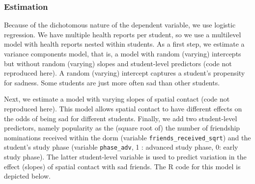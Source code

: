 \documentclass[doc]{apa6}
\begin{document}
\subsubsection{Estimation}\label{estimation}

Because of the dichotomous nature of the dependent variable, we use
logistic regression. We have multiple health reports per student, so we
use a multilevel model with health reports nested within students. As a
first step, we estimate a variance components model, that is, a model
with random (varying) intercepts but without random (varying) slopes and
student-level predictors (code not reproduced here). A random (varying)
intercept captures a student's propensity for sadness. Some students are
just more often sad than other students.

Next, we estimate a model with varying slopes of spatial contact (code
not reproduced here). This model allows spatial contact to have
different effects on the odds of being sad for different students.
Finally, we add two student-level predictors, namely popularity as the
(square root of) the number of friendship nominations received within
the dorm (variable \texttt{friends\_received\_sqrt}) and the student's
study phase (variable \texttt{phase\_adv}, 1 : advanced study phase, 0:
early study phase). The latter student-level variable is used to predict
variation in the effect (slopes) of spatial contact with sad friends.
The R code for this model is depicted below.
\end{document}
